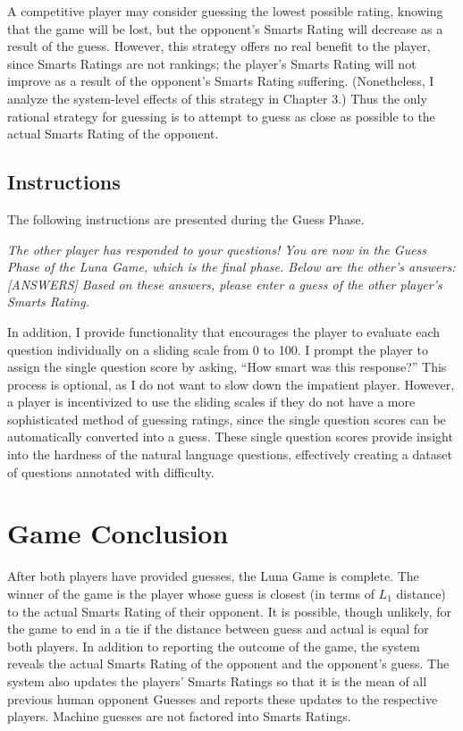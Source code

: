 A competitive player may consider guessing the lowest possible rating, knowing that the game will be lost, but the opponent's Smarts Rating will decrease as a result of the guess. However, this strategy offers no real benefit to the player, since Smarts Ratings are not rankings; the player's Smarts Rating will not improve as a result of the opponent's Smarts Rating suffering. (Nonetheless, I analyze the system-level effects of this strategy in Chapter 3.) Thus the only rational strategy for guessing is to attempt to guess as close as possible to the actual Smarts Rating of the opponent.

\subsection{Instructions}

The following instructions are presented during the Guess Phase.
\begin{center}
\textit{The other player has responded to your questions! You are now in the Guess Phase of the Luna Game, which is the final phase. Below are the other's answers: [ANSWERS] Based on these answers, please enter a guess of the other player's Smarts Rating.}
\end{center}
In addition, I provide functionality that encourages the player to evaluate each question individually on a sliding scale from 0 to 100. I prompt the player to assign the single question score by asking, ``How smart was this response?'' This process is optional, as I do not want to slow down the impatient player. However, a player is incentivized to use the sliding scales if they do not have a more sophisticated method of guessing ratings, since the single question scores can be automatically converted into a guess. These single question scores provide insight into the hardness of the natural language questions, effectively creating a dataset of questions annotated with difficulty.

\section{Game Conclusion}

After both players have provided guesses, the Luna Game is complete. The winner of the game is the player whose guess is closest (in terms of $L_1$ distance) to the actual Smarts Rating of their opponent. It is possible, though unlikely, for the game to end in a tie if the distance between guess and actual is equal for both players. In addition to reporting the outcome of the game, the system reveals the actual Smarts Rating of the opponent and the opponent's guess. The system also updates the players' Smarts Ratings so that it is the mean of all previous human opponent Guesses and reports these updates to the respective players. Machine guesses are not factored into Smarts Ratings.

